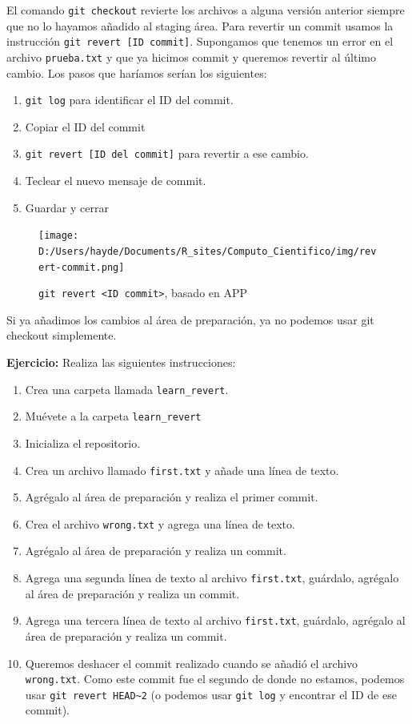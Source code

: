 \documentclass[
]{book}
\begin{document}
El comando \texttt{git\ checkout} revierte los archivos a alguna versión anterior siempre que no lo hayamos añadido al staging área. Para revertir un commit usamos la instrucción \texttt{git\ revert\ {[}ID\ commit{]}}. Supongamos que tenemos un error en el archivo \texttt{prueba.txt} y que ya hicimos commit y queremos revertir al último cambio. Los pasos que haríamos serían los siguientes:

\begin{enumerate}
\def\labelenumi{\arabic{enumi})}
\item
  \texttt{git\ log} para identificar el ID del commit.
\item
  Copiar el ID del commit
\item
  \texttt{git\ revert\ {[}ID\ del\ commit{]}} para revertir a ese cambio.
\item
  Teclear el nuevo mensaje de commit.
\item
  Guardar y cerrar
\end{enumerate}

\begin{figure}
\centering
\texttt{[image: D:/Users/hayde/Documents/R\_sites/Computo\_Cientifico/img/revert-commit.png]}
\caption{\texttt{git\ revert\ \textless{}ID\ commit\textgreater{}}, basado en APP}
\end{figure}

Si ya añadimos los cambios al área de preparación, ya no podemos usar git checkout simplemente.

\textbf{Ejercicio:} Realiza las siguientes instrucciones:

\begin{enumerate}
\def\labelenumi{\arabic{enumi})}
\item
  Crea una carpeta llamada \texttt{learn\_revert}.
\item
  Muévete a la carpeta \texttt{learn\_revert}
\item
  Inicializa el repositorio.
\item
  Crea un archivo llamado \texttt{first.txt} y añade una línea de texto.
\item
  Agrégalo al área de preparación y realiza el primer commit.
\item
  Crea el archivo \texttt{wrong.txt} y agrega una línea de texto.
\item
  Agrégalo al área de preparación y realiza un commit.
\item
  Agrega una segunda línea de texto al archivo \texttt{first.txt}, guárdalo, agrégalo al área de preparación y realiza un commit.
\item
  Agrega una tercera línea de texto al archivo \texttt{first.txt}, guárdalo, agrégalo al área de preparación y realiza un commit.
\item
  Queremos deshacer el commit realizado cuando se añadió el archivo \texttt{wrong.txt}. Como este commit fue el segundo de donde no estamos, podemos usar \texttt{git\ revert\ HEAD\textasciitilde{}2} (o podemos usar \texttt{git\ log} y encontrar el ID de ese commit).
\end{enumerate}
\end{document}
